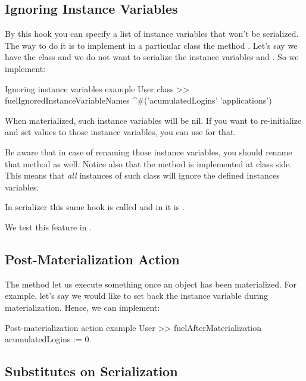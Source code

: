 \documentclass[a4paper,10pt,twoside]{book}
\begin{document}
\subsection{Ignoring Instance Variables}

By this hook you can specify a list of instance variables that won't be serialized. The way to do it is to implement in a particular class the method . Let's say we have the class  and we do not want to serialize the instance variables  and . So we implement:

\begin{code}{Ignoring instance variables example}
User class >> fuelIgnoredInstanceVariableNames
    ^#('acumulatedLogins' 'applications')
\end{code}

When materialized, such instance variables will be nil. If you want to re-initialize and set values to those instance variables, you can use  for that.

Be aware that in case of renaming those instance variables, you should rename that method as well. Notice also that the method  is implemented at class side. This means that \emph{all} instances of such class will ignore the defined instances variables. 

In  serializer this same hook is called  and in  it is . 

We test this feature in .


\subsection{Post-Materialization Action}

The method  let us execute something once an object has been materialized. For example, let's say we would like to set back the instance variable  during materialization. Hence, we can implement:

\begin{code}{Post-materialization action example}
User >> fuelAfterMaterialization
 acumulatedLogins := 0. 
\end{code}


\subsection{Substitutes on Serialization}
\end{document}
